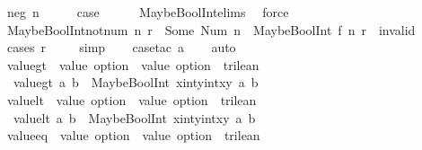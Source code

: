 \begin{isabellebody}
\ {\isacharparenleft}neg\ n{\isacharparenright}\isanewline
\ \ \isamarkupfalse%
\ \isamarkupfalse%
\ {\isacharquery}case\isanewline
\ \ \ \ \isamarkupfalse%
\ MaybeBoolInt{\isachardot}elims\ \isamarkupfalse%
\ force\isanewline
{}\isamarkupfalse%
%
\endisatagproof
{\isafoldproof}%
%
\isadelimproof
\isanewline
%
\endisadelimproof
\isanewline
{}\isamarkupfalse%
\ MaybeBoolInt{\isacharunderscore}not{\isacharunderscore}num{\isacharunderscore}{}{\isacharcolon}\ {\isachardoublequoteopen}{\isasymforall}n{\isachardot}\ r\ {\isasymnoteq}\ Some\ {\isacharparenleft}Num\ n{\isacharparenright}\ {\isasymLongrightarrow}\ MaybeBoolInt\ f\ n\ r\ {\isacharequal}\ invalid{\isachardoublequoteclose}\isanewline
%
\isadelimproof
\ \ %
\endisadelimproof
%
\isatagproof
{}\isamarkupfalse%
\ {\isacharparenleft}cases\ r{\isacharparenright}\isanewline
\ \ \ \isamarkupfalse%
\ simp\isanewline
\ \ \isamarkupfalse%
\ {\isacharparenleft}case{\isacharunderscore}tac\ a{\isacharparenright}\isanewline
\ \ \isamarkupfalse%
\ auto%
\endisatagproof
{\isafoldproof}%
%
\isadelimproof
\isanewline
%
\endisadelimproof
\isanewline
{}\isamarkupfalse%
\ value{\isacharunderscore}gt\ {\isacharcolon}{\isacharcolon}\ {\isachardoublequoteopen}value\ option\ {\isasymRightarrow}\ value\ option\ {\isasymRightarrow}\ trilean{\isachardoublequoteclose}\ \ \isanewline
\ \ {\isachardoublequoteopen}value{\isacharunderscore}gt\ a\ b\ {\isasymequiv}\ MaybeBoolInt\ {\isacharparenleft}{\isasymlambda}x{\isacharcolon}{\isacharcolon}int{\isachardot}{\isasymlambda}y{\isacharcolon}{\isacharcolon}int{\isachardot}{\isacharparenleft}x{\isachargreater}y{\isacharparenright}{\isacharparenright}\ a\ b{\isachardoublequoteclose}\isanewline
\isanewline
{}\isamarkupfalse%
\ value{\isacharunderscore}lt\ {\isacharcolon}{\isacharcolon}\ {\isachardoublequoteopen}value\ option\ {\isasymRightarrow}\ value\ option\ {\isasymRightarrow}\ trilean{\isachardoublequoteclose}\ \ \isanewline
\ \ {\isachardoublequoteopen}value{\isacharunderscore}lt\ a\ b\ {\isasymequiv}\ MaybeBoolInt\ {\isacharparenleft}{\isasymlambda}x{\isacharcolon}{\isacharcolon}int{\isachardot}{\isasymlambda}y{\isacharcolon}{\isacharcolon}int{\isachardot}{\isacharparenleft}x{\isacharless}y{\isacharparenright}{\isacharparenright}\ a\ b{\isachardoublequoteclose}\isanewline
\isanewline
{}\isamarkupfalse%
\ value{\isacharunderscore}eq\ {\isacharcolon}{\isacharcolon}\ {\isachardoublequoteopen}value\ option\ {\isasymRightarrow}\ value\ option\ {\isasymRightarrow}\ trilean{\isachardoublequoteclose}\ \ \isanewline

\end{isabellebody}

